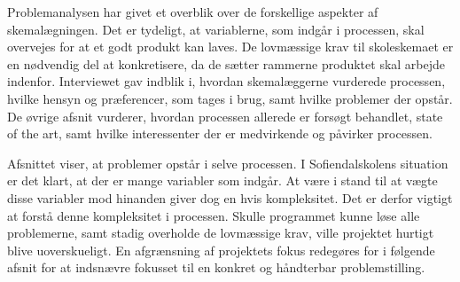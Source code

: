 Problemanalysen har givet et overblik over de forskellige aspekter af skemalægningen. Det er tydeligt, at variablerne, som indgår i processen, skal overvejes for at et godt produkt kan laves. De lovmæssige krav til skoleskemaet er en nødvendig del at konkretisere, da de sætter rammerne produktet skal arbejde indenfor. Interviewet gav indblik i, hvordan skemalæggerne vurderede processen, hvilke hensyn og præferencer, som tages i brug, samt hvilke problemer der opstår. De øvrige afsnit vurderer, hvordan processen allerede er forsøgt behandlet, state of the art, samt hvilke interessenter der er medvirkende og påvirker processen.

Afsnittet viser, at problemer opstår i selve processen. I Sofiendalskolens situation er det klart, at der er mange variabler som indgår. At være i stand til at vægte disse variabler mod hinanden giver dog en hvis kompleksitet. Det er derfor vigtigt at forstå denne kompleksitet i processen. Skulle programmet kunne løse alle problemerne, samt stadig overholde de lovmæssige krav, ville projektet hurtigt blive uoverskueligt. En afgrænsning af projektets fokus redegøres for i følgende afsnit for at indsnævre fokusset til en konkret og håndterbar problemstilling.
